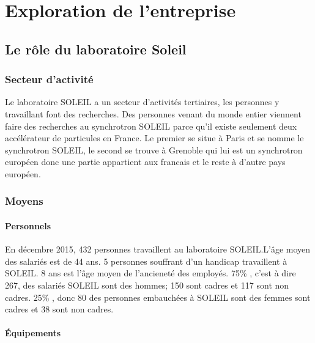 \chapter{Exploration de l'entreprise}
	\minitoc






\section{Le rôle du laboratoire Soleil}

	\subsection{Secteur d'activit\'e}
				Le laboratoire SOLEIL a un secteur d'activités tertiaires, les personnes y travaillant font des recherches. 
				Des personnes venant du monde entier viennent faire des recherches au synchrotron SOLEIL parce qu'il existe seulement deux accélérateur de particules en France. Le premier se situe à Paris et se nomme le synchrotron SOLEIL, le second se trouve à Grenoble qui lui est un synchrotron européen donc une partie appartient aux francais et le reste à d'autre pays européen.
	\subsection{Moyens}
		\subsubsection{Personnels}
				En décembre 2015, 432 personnes travaillent au laboratoire SOLEIL.L'âge moyen des salariés est de 44 ans. 5 personnes souffrant d'un handicap travaillent à SOLEIL. 8 ans est l'âge moyen de l'ancieneté des employés.
				75\% , c'est à dire 267, des salariés SOLEIL sont des hommes; 150 sont cadres et 117 sont non cadres.
				25\% , donc 80 des personnes embauchées à SOLEIL sont des femmes sont cadres et 38 sont non cadres.


		\subsubsection{Équipements}
			
